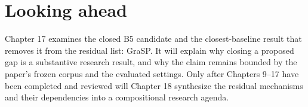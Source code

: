 \section*{Looking ahead}

Chapter 17 examines the closed B5 candidate and the closest-baseline result that removes it from the residual list: GraSP. It will explain why closing a proposed gap is a substantive research result, and why the claim remains bounded by the paper's frozen corpus and the evaluated settings. Only after Chapters 9--17 have been completed and reviewed will Chapter 18 synthesize the residual mechanisms and their dependencies into a compositional research agenda.
